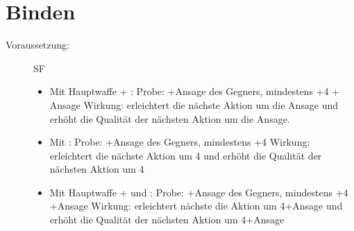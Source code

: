 \section{Binden}
\label{reaktion.binden}
\begin{description}
    \item[Voraussetzung:]
        SF 
        \begin{itemize}
            \item
                Mit Hauptwaffe + :\newline
                Probe: +Ansage des Gegners, mindestens +4 + Ansage\newline
                Wirkung: erleichtert die nächste Aktion um die Ansage und erhöht die Qualität der nächsten Aktion um die Ansage.
            \item
                Mit :\newline
                Probe: +Ansage des Gegners, mindestens +4\newline
                Wirkung: erleichtert die nächste Aktion um 4 und erhöht die Qualität der nächsten Aktion um 4
            \item
                Mit Hauptwaffe +  und :\newline
                Probe: +Ansage des Gegners, mindestens +4 +Ansage\newline
                Wirkung: erleichtert nächste die Aktion um 4+Ansage und erhöht die Qualität der nächsten Aktion um 4+Ansage
        \end{itemize}
\end{description}
